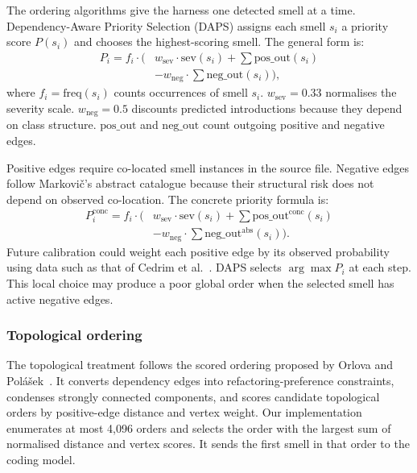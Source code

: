 \documentclass[conference]{IEEEtran}
\begin{document}
The ordering algorithms give the harness one detected smell at a time.
Dependency-Aware Priority Selection (DAPS) assigns each smell $s_i$ a priority
score $P(s_i)$ and chooses the highest-scoring smell.
The general form is:
\begin{equation}
  \begin{split}
    P_i = f_i \cdot \bigl( &w_{\mathrm{sev}} \cdot \mathrm{sev}(s_i)
           + \textstyle\sum \mathrm{pos\_out}(s_i) \\
           &- w_{\mathrm{neg}} \cdot \textstyle\sum \mathrm{neg\_out}(s_i) \bigr),
  \end{split}
  \label{eq:p-general}
\end{equation}
where $f_i = \mathrm{freq}(s_i)$ counts occurrences of smell $s_i$.
$w_{\mathrm{sev}}{=}0.33$ normalises the severity scale.
$w_{\mathrm{neg}}{=}0.5$ discounts predicted introductions because they depend
on class structure. $\mathrm{pos\_out}$ and $\mathrm{neg\_out}$ count outgoing
positive and negative edges.

Positive edges require co-located smell instances in the source file. Negative
edges follow Markovič's abstract catalogue because their structural risk does
not depend on observed co-location.
The concrete priority formula is:
\begin{equation}
  \begin{split}
    P^{\mathrm{conc}}_i = f_i \cdot \bigl( &w_{\mathrm{sev}} \cdot \mathrm{sev}(s_i)
           + \textstyle\sum \mathrm{pos\_out}^{\mathrm{conc}}(s_i) \\
           &- w_{\mathrm{neg}} \cdot \textstyle\sum \mathrm{neg\_out}^{\mathrm{abs}}(s_i) \bigr).
  \end{split}
  \label{eq:p-concrete}
\end{equation}
Future calibration could weight each positive edge by its observed probability
using data such as that of Cedrim et al.~\cite{cedrim2017}.
DAPS selects $\arg\max P_i$ at each step. This local choice may produce a poor
global order when the selected smell has active negative edges.

\subsubsection{Topological ordering}
The topological treatment follows the scored ordering proposed by Orlova and
Polášek~\cite{orlova2026topological}. It converts dependency edges into
refactoring-preference constraints, condenses strongly connected components,
and scores candidate topological orders by positive-edge distance and vertex
weight. Our implementation enumerates at most 4,096 orders and selects the order
with the largest sum of normalised distance and vertex scores. It sends the
first smell in that order to the coding model.
\end{document}
